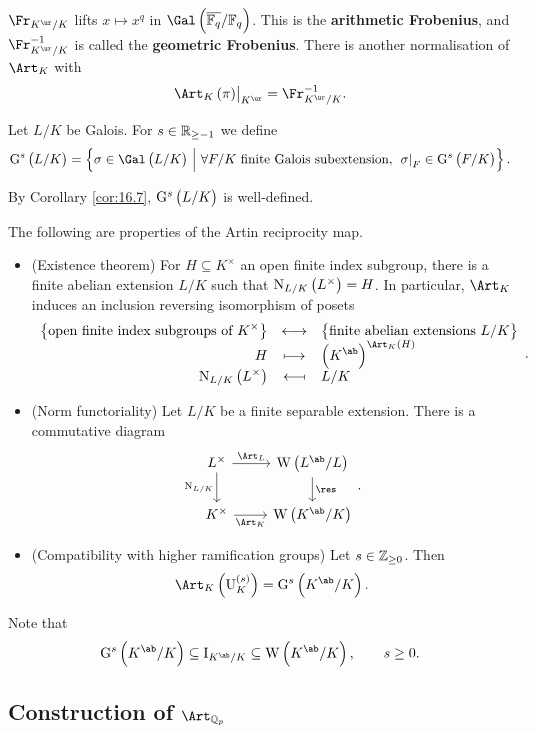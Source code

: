 \begin{remark*}
$ \Fr_{K^{\ur} / K} $ lifts $ x \mapsto x^q $ in $ \Gal\br{\overline{\FF_q} / \FF_q} $. This is the \textbf{arithmetic Frobenius}, and $ \Fr_{K^{\ur} / K}^{-1} $ is called the \textbf{geometric Frobenius}. There is another normalisation of $ \Art_K $ with
$$ \eval{\Art_K\br{\pi}}_{K^{\ur}} = \Fr_{K^{\ur} / K}^{-1}. $$
\end{remark*}

\begin{definition}
Let $ L / K $ be Galois. For $ s \in \mathbb{R}_{\ge -1} $ we define
$$ \G^s\br{L / K} = \cbr{\sigma \in \Gal\br{L / K} \st \forall F / K \ \text{finite Galois subextension}, \ \eval{\sigma}_F \in \G^s\br{F / K}}. $$
\end{definition}

By Corollary \ref{cor:16.7}, $ \G^s\br{L / K} $ is well-defined.

\pagebreak

\begin{proposition}
The following are properties of the Artin reciprocity map.
\begin{itemize}
\item (Existence theorem) For $ H \subseteq K^\times $ an open finite index subgroup, there is a finite abelian extension $ L / K $ such that $ \N_{L / K}\br{L^\times} = H $. In particular, $ \Art_K $ induces an inclusion reversing isomorphism of posets
$$ \bijection{\cbr{\text{open finite index subgroups of} \ K^\times}}{\cbr{\text{finite abelian extensions} \ L / K}}{H}{\br{K^{\ab}}^{\Art_K\br{H}}}{\N_{L / K}\br{L^\times}}{L / K}. $$
\item (Norm functoriality) Let $ L / K $ be a finite separable extension. There is a commutative diagram
$$
\begin{tikzcd}
L^\times \arrow{r}{\Art_L} \arrow{d}[swap]{\N_{L / K}} & \W\br{L^{\ab} / L} \arrow{d}{\res} \\
K^\times \arrow{r}[swap]{\Art_K} & \W\br{K^{\ab} / K}
\end{tikzcd}.
$$
\item (Compatibility with higher ramification groups) Let $ s \in \mathbb{Z}_{\ge 0} $. Then
$$ \Art_K\br{\U_K^{\br{s}}} = \G^s\br{K^{\ab} / K}. $$
\end{itemize}
\end{proposition}

Note that
$$ \G^s\br{K^{\ab} / K} \subseteq \I_{K^{\ab} / K} \subseteq \W\br{K^{\ab} / K}, \qquad s \ge 0. $$

\subsection{Construction of \texorpdfstring{$ \Art_{\QQ_p} $}{the Artin map}}

